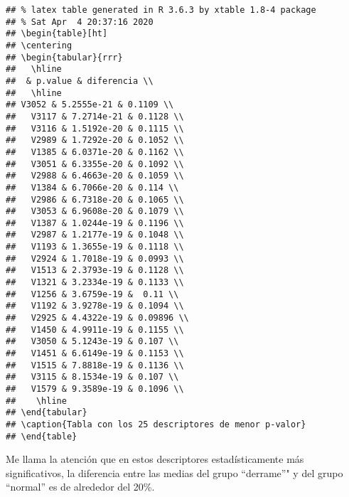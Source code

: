 \documentclass[]{article}
\begin{document}
\begin{verbatim}
## % latex table generated in R 3.6.3 by xtable 1.8-4 package
## % Sat Apr  4 20:37:16 2020
## \begin{table}[ht]
## \centering
## \begin{tabular}{rrr}
##   \hline
##  & p.value & diferencia \\ 
##   \hline
## V3052 & 5.2555e-21 & 0.1109 \\ 
##   V3117 & 7.2714e-21 & 0.1128 \\ 
##   V3116 & 1.5192e-20 & 0.1115 \\ 
##   V2989 & 1.7292e-20 & 0.1052 \\ 
##   V1385 & 6.0371e-20 & 0.1162 \\ 
##   V3051 & 6.3355e-20 & 0.1092 \\ 
##   V2988 & 6.4663e-20 & 0.1059 \\ 
##   V1384 & 6.7066e-20 & 0.114 \\ 
##   V2986 & 6.7318e-20 & 0.1065 \\ 
##   V3053 & 6.9608e-20 & 0.1079 \\ 
##   V1387 & 1.0244e-19 & 0.1196 \\ 
##   V2987 & 1.2177e-19 & 0.1048 \\ 
##   V1193 & 1.3655e-19 & 0.1118 \\ 
##   V2924 & 1.7018e-19 & 0.0993 \\ 
##   V1513 & 2.3793e-19 & 0.1128 \\ 
##   V1321 & 3.2334e-19 & 0.1133 \\ 
##   V1256 & 3.6759e-19 &  0.11 \\ 
##   V1192 & 3.9278e-19 & 0.1094 \\ 
##   V2925 & 4.4322e-19 & 0.09896 \\ 
##   V1450 & 4.9911e-19 & 0.1155 \\ 
##   V3050 & 5.1243e-19 & 0.107 \\ 
##   V1451 & 6.6149e-19 & 0.1153 \\ 
##   V1515 & 7.8818e-19 & 0.1136 \\ 
##   V3115 & 8.1534e-19 & 0.107 \\ 
##   V1579 & 9.3589e-19 & 0.1096 \\ 
##    \hline
## \end{tabular}
## \caption{Tabla con los 25 descriptores de menor p-valor} 
## \end{table}
\end{verbatim}

Me llama la atención que en estos descriptores estadísticamente más
significativos, la diferencia entre las medias del grupo ``derrame''" y
del grupo ``normal'' es de alrededor del 20\%.
\end{document}
